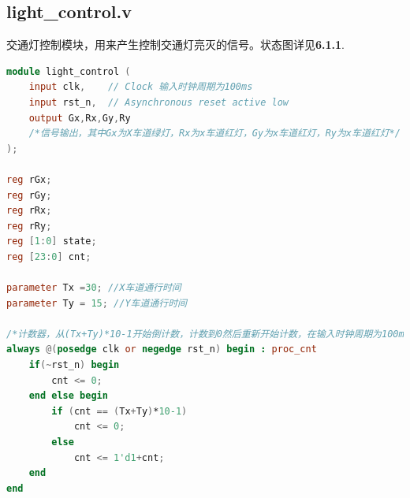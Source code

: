 \documentclass[12pt,a4paper]{article}
\begin{document}
	\subsection{light\_control.v}
	交通灯控制模块，用来产生控制交通灯亮灭的信号。状态图详见\textbf{6.1.1}.
	\begin{lstlisting}[language=Verilog]
module light_control (
	input clk,    // Clock 输入时钟周期为100ms
	input rst_n,  // Asynchronous reset active low
	output Gx,Rx,Gy,Ry 
	/*信号输出，其中Gx为X车道绿灯，Rx为x车道红灯，Gy为x车道红灯，Ry为x车道红灯*/
);

reg rGx;
reg rGy;
reg rRx;
reg rRy;
reg [1:0] state;
reg [23:0] cnt;

parameter Tx =30; //X车道通行时间
parameter Ty = 15; //Y车道通行时间

/*计数器，从(Tx+Ty)*10-1开始倒计数，计数到0然后重新开始计数，在输入时钟周期为100ms的条件下，每一个计数周期用时为(Tx+Ty)秒*/
always @(posedge clk or negedge rst_n) begin : proc_cnt
	if(~rst_n) begin
		cnt <= 0;
	end else begin
		if (cnt == (Tx+Ty)*10-1)
			cnt <= 0;
		else
			cnt <= 1'd1+cnt;
	end
end


\end{lstlisting}
\end{document}
